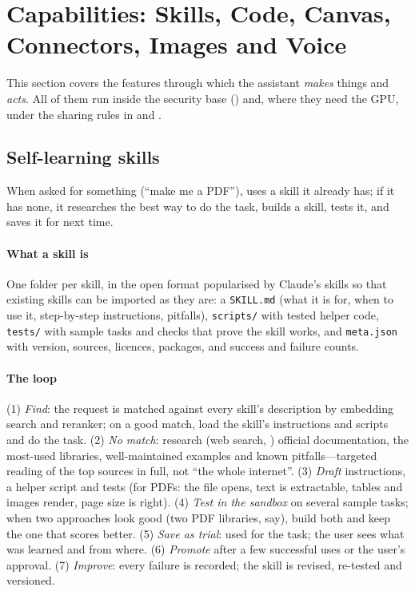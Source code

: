 \section{Capabilities: Skills, Code, Canvas, Connectors, Images and Voice}
\label{sec:capabilities}

This section covers the features through which the assistant \emph{makes} things and \emph{acts}. All of them run inside the security base () and, where they need the GPU, under the sharing rules in  and .

\subsection{Self-learning skills}

When asked for something (``make me a PDF''), \hivi{} uses a skill it already has; if it has none, it researches the best way to do the task, builds a skill, tests it, and saves it for next time.

\paragraph{What a skill is} One folder per skill, in the open format popularised by Claude's skills so that existing skills can be imported as they are: a \texttt{SKILL.md} (what it is for, when to use it, step-by-step instructions, pitfalls), \texttt{scripts/} with tested helper code, \texttt{tests/} with sample tasks and checks that prove the skill works, and \texttt{meta.json} with version, sources, licences, packages, and success and failure counts.

\paragraph{The loop} (1) \emph{Find}: the request is matched against every skill's description by embedding search and reranker; on a good match, load the skill's instructions and scripts and do the task. (2) \emph{No match}: research (web search, ) official documentation, the most-used libraries, well-maintained examples and known pitfalls---targeted reading of the top sources in full, not ``the whole internet''. (3) \emph{Draft} instructions, a helper script and tests (for PDFs: the file opens, text is extractable, tables and images render, page size is right). (4) \emph{Test in the sandbox} on several sample tasks; when two approaches look good (two PDF libraries, say), build both and keep the one that scores better. (5) \emph{Save as trial}: used for the task; the user sees what was learned and from where. (6) \emph{Promote} after a few successful uses or the user's approval. (7) \emph{Improve}: every failure is recorded; the skill is revised, re-tested and versioned.

